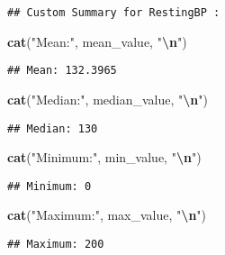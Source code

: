 \documentclass[
]{article}
\newenvironment{Shaded}{\begin{snugshade}}{\end{snugshade}}
\newcommand{\FunctionTok}[1]{\textcolor[rgb]{0.13,0.29,0.53}{\textbf{#1}}}
\newcommand{\NormalTok}[1]{#1}
\newcommand{\SpecialCharTok}[1]{\textcolor[rgb]{0.81,0.36,0.00}{\textbf{#1}}}
\newcommand{\StringTok}[1]{\textcolor[rgb]{0.31,0.60,0.02}{#1}}
\begin{document}
\begin{verbatim}
## Custom Summary for RestingBP :
\end{verbatim}

\begin{Shaded}
\begin{Highlighting}[]
\FunctionTok{cat}\NormalTok{(}\StringTok{"Mean:"}\NormalTok{, mean\_value, }\StringTok{"}\SpecialCharTok{\textbackslash{}n}\StringTok{"}\NormalTok{)}
\end{Highlighting}
\end{Shaded}

\begin{verbatim}
## Mean: 132.3965
\end{verbatim}

\begin{Shaded}
\begin{Highlighting}[]
\FunctionTok{cat}\NormalTok{(}\StringTok{"Median:"}\NormalTok{, median\_value, }\StringTok{"}\SpecialCharTok{\textbackslash{}n}\StringTok{"}\NormalTok{)}
\end{Highlighting}
\end{Shaded}

\begin{verbatim}
## Median: 130
\end{verbatim}

\begin{Shaded}
\begin{Highlighting}[]
\FunctionTok{cat}\NormalTok{(}\StringTok{"Minimum:"}\NormalTok{, min\_value, }\StringTok{"}\SpecialCharTok{\textbackslash{}n}\StringTok{"}\NormalTok{)}
\end{Highlighting}
\end{Shaded}

\begin{verbatim}
## Minimum: 0
\end{verbatim}

\begin{Shaded}
\begin{Highlighting}[]
\FunctionTok{cat}\NormalTok{(}\StringTok{"Maximum:"}\NormalTok{, max\_value, }\StringTok{"}\SpecialCharTok{\textbackslash{}n}\StringTok{"}\NormalTok{)}
\end{Highlighting}
\end{Shaded}

\begin{verbatim}
## Maximum: 200
\end{verbatim}
\end{document}
